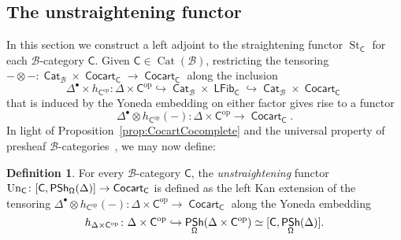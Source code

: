 \documentclass[reqno]{amsart}
\numberwithin{equation}{subsection}
\theoremstyle{plain}
\theoremstyle{definition}
\newtheorem{definition}[equation]{Definition}
\let\scr=\mathcal
\let\into=\hookrightarrow
\def\BB{\scr B}
\DeclareMathOperator{\IPSh}{\mathsf{PSh}}
\DeclareMathOperator{\Cat}{Cat}
\DeclareMathOperator{\ICat}{\mathsf{Cat}}
\DeclareMathOperator{\ICocart}{\mathsf{Cocart}}
\DeclareMathOperator{\ILFib}{\mathsf{LFib}}
\DeclareMathOperator{\St}{St}
\DeclareMathOperator{\Un}{Un}
\newcommand{\op}{\mathrm{op}}
\newcommand{\I}[1]{\mathsf{#1}}
\newcommand{\iFun}[2]{{[#1,#2]}}
\begin{document}
\subsection{The unstraightening functor}
\label{sec:unstraightening}
In this section we construct a left adjoint to the straightening functor $\St_{\I{C}}$ for each $\BB$-category $\I{C}$. Given $\I{C}\in\Cat(\BB)$, restricting the tensoring $-\otimes -\colon\ICat_{\BB}\times\ICocart_{\I{C}}\to \ICocart_{\I{C}}$ along the inclusion
\begin{equation*}
\Delta^{\bullet}\times h_{\I{C}^{\op}}\colon\Delta\times\I{C}^{\op}\into \ICat_{\BB}\times\ILFib_{\I{C}}\into\ICat_{\BB}\times\ICocart_{\I{C}}
\end{equation*}
that is induced by the Yoneda embedding on either factor gives rise to a functor
\begin{equation*}
\Delta^{\bullet}\otimes h_{\I{C}^{\op}}(-)\colon \Delta\times\I{C}^{\op}\to\ICocart_{\I{C}}.
\end{equation*}
In light of Proposition~\ref{prop:CocartCocomplete} and the universal property of presheaf $\BB$-categories~\cite[Theorem~7.1.1]{Martini2021a}, we may now define:
\begin{definition}
	\label{def:unstraightening}
	For every $\BB$-category $\I{C}$, the \emph{unstraightening} functor $\Un_{\I{C}}\colon \iFun{\I{C}}{\IPSh_{\Univ}(\Delta)}\to\ICocart_{\I{C}}$ is defined as the left Kan extension of the tensoring $\Delta^{\bullet}\otimes h_{\I{C}^{\op}}(-)\colon \Delta\times\I{C}^{\op}\to\ICocart_{\I{C}}$ along the Yoneda embedding
	\begin{equation*}
	h_{\Delta\times\I{C}^{\op}}\colon\Delta\times\I{C}^{\op}\into\IPSh_{\Univ}(\Delta\times\I{C}^{\op})\simeq\iFun{\I{C}}{\IPSh_{\Univ}(\Delta)}.
	\end{equation*} 
\end{definition}
\end{document}
